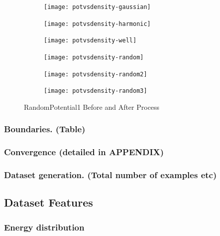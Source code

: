 \documentclass[a4paper,times,hidelinks,12pt]{article}
\begin{document}
\graphicspath{{"../figs/potentials/"}}
\begin{figure}[H]
    \centering
    \begin{subfigure}[t]{0.45\textwidth}
        \texttt{[image: potvsdensity-gaussian]}
    \end{subfigure}
    \begin{subfigure}[t]{0.45\textwidth}
        \texttt{[image: potvsdensity-harmonic]}
    \end{subfigure}
    \begin{subfigure}[t]{0.45\textwidth}
        \texttt{[image: potvsdensity-well]}
    \end{subfigure}
    \begin{subfigure}[t]{0.45\textwidth}
        \texttt{[image: potvsdensity-random]}
    \end{subfigure}
    \begin{subfigure}[t]{0.45\textwidth}
        \texttt{[image: potvsdensity-random2]}
    \end{subfigure}
    \begin{subfigure}[t]{0.45\textwidth}
        \texttt{[image: potvsdensity-random3]}
    \end{subfigure}
\caption{RandomPotential1 Before and After Process}
\label{fig:random3_before_after}
\end{figure}





\subsubsection{Boundaries. (Table)}
\subsubsection{Convergence (detailed in APPENDIX)}
\subsubsection{Dataset generation. (Total number of examples etc)}

\subsection{Dataset Features}
\subsubsection{Energy distribution}
\end{document}
